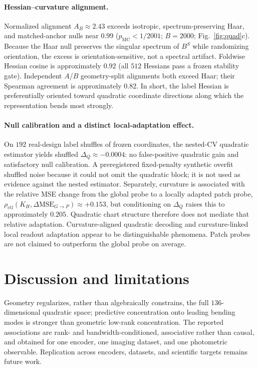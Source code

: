\documentclass{article}
\begin{document}
\paragraph{Hessian--curvature alignment.}
Normalized alignment $A_B\approx2.43$ exceeds isotropic, spectrum-preserving Haar, and matched-anchor nulls near $0.99$ ($p_{\mathrm{MC}}<1/2001$; $B{=}2000$; Fig.~\ref{fig:quad}c).
Because the Haar null preserves the singular spectrum of $B^S$ while randomizing orientation, the excess is orientation-sensitive, not a spectral artifact.
Foldwise Hessian cosine is approximately $0.92$ (all $512$ Hessians pass a frozen stability gate).
Independent $A$/$B$ geometry-split alignments both exceed Haar; their Spearman agreement is approximately $0.82$.
In short, the label Hessian is preferentially oriented toward quadratic coordinate directions along which the representation bends most strongly.

\paragraph{Null calibration and a distinct local-adaptation effect.}
On $192$ real-design label shuffles of frozen coordinates, the nested-CV quadratic estimator yields shuffled $\Delta_Q\approx-0.0004$: no false-positive quadratic gain and satisfactory null calibration.
A preregistered fixed-penalty synthetic overfit shuffled noise because it could not omit the quadratic block; it is not used as evidence against the nested estimator.
Separately, curvature is associated with the relative MSE change from the global probe to a locally adapted patch probe,
$\rho_{\mathrm{ctl}}(K_H,\Delta\mathrm{MSE}_{G\rightarrow P})\approx{+}0.153$,
but conditioning on $\Delta_Q$ raises this to approximately $0.205$.
Quadratic chart structure therefore does not mediate that relative adaptation.
Curvature-aligned quadratic decoding and curvature-linked local readout adaptation appear to be distinguishable phenomena.
Patch probes are not claimed to outperform the global probe on average.

\section{Discussion and limitations}
\label{sec:disc}

Geometry regularizes, rather than algebraically constrains, the full $136$-dimensional quadratic space; predictive concentration onto leading bending modes is stronger than geometric low-rank concentration.
The reported associations are rank- and bandwidth-conditioned, associative rather than causal, and obtained for one encoder, one imaging dataset, and one photometric observable.
Replication across encoders, datasets, and scientific targets remains future work.
\end{document}
